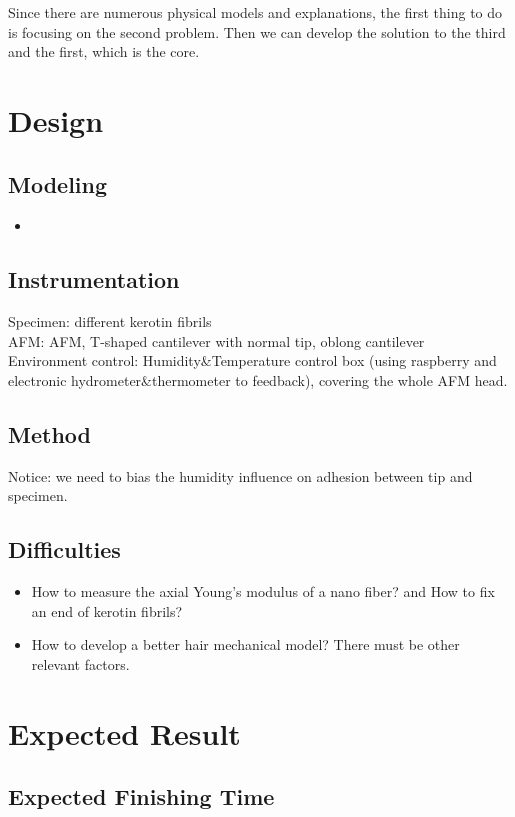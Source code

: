 \documentclass{article}
\begin{document}
Since there are numerous physical models and explanations, the first thing to do is focusing on the second problem. Then we can develop the solution to the third and the first, which is the core.


\section{Design}
\subsection{Modeling}
\begin{itemize}
    \item 
\end{itemize}

\subsection{Instrumentation}
Specimen: different kerotin fibrils\\
AFM: AFM, T-shaped cantilever with normal tip, oblong cantilever\\
Environment control: Humidity\&Temperature control box (using raspberry and electronic hydrometer\&thermometer to feedback), covering the whole AFM head.

\subsection{Method}

Notice: we need to bias the humidity influence on adhesion between tip and specimen.

\subsection{Difficulties}
\begin{itemize}
    \item How to measure the axial Young's modulus of a nano fiber? and How to fix an end of kerotin fibrils?
    
    \item How to develop a better hair mechanical model? There must be other relevant factors.
\end{itemize}




\section{Expected Result}
\subsection{Expected Finishing Time}



\end{document}
